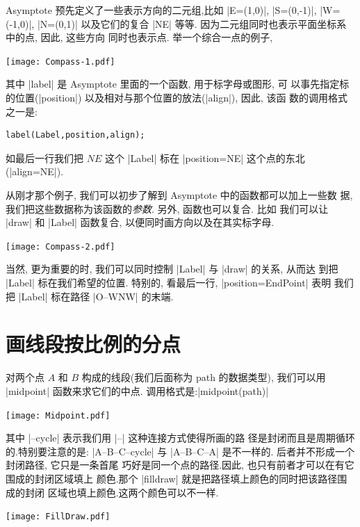 \documentclass{ctexbook}
\begin{document}
Asymptote 预先定义了一些表示方向的二元组,比如  |E=(1,0)|,
|S=(0,-1)|, |W=(-1,0)|, |N=(0,1)| 以及它们的复合
|NE| 等等. 因为二元组同时也表示平面坐标系中的点, 因此, 这些方向
同时也表示点. 举一个综合一点的例子,

\begin{center}\texttt{[image: Compass-1.pdf]}\end{center}%


其中 |label| 是 Asymptote 里面的一个函数, 用于标字母或图形, 可
以事先指定标的位置(|position|) 以及相对与那个位置的放法(|align|), 因此, 该函
数的调用格式之一是:
\begin{verbatim}
label(Label,position,align);
\end{verbatim}
如最后一行我们把 $NE$ 这个 |Label| 标在 |position=NE| 这个点的东北
(|align=NE|).

从刚才那个例子, 我们可以初步了解到 Asymptote 中的函数都可以加上一些数
据, 我们把这些数据称为该函数的\emph{参数}. 另外, 函数也可以复合. 比如
我们可以让 |draw| 和 |Label| 函数复合, 以便同时画方向以及在其实标字母.
\begin{center}\texttt{[image: Compass-2.pdf]}\end{center}%

当然, 更为重要的时, 我们可以同时控制 |Label| 与 |draw| 的关系, 从而达
到把 |Label| 标在我们希望的位置. 特别的, 看最后一行, |position=EndPoint| 表明
我们把 |Label| 标在路径 |O--WNW| 的末端.

\section{画线段按比例的分点}
对两个点 $A$ 和 $B$ 构成的线段(我们后面称为 {path} 的数据类型),
我们可以用 |midpoint| 函数来求它们的中点.
调用格式是:|midpoint(path)|

\begin{center}\texttt{[image: Midpoint.pdf]}\end{center}%


其中 |--cycle| 表示我们用 |--| 这种连接方式使得所画的路
径是封闭而且是周期循环的.特别要注意的是: |A--B--C--cycle| 与
|A--B--C--A| 是不一样的. 后者并不形成一个封闭路径, 它只是一条首尾
巧好是同一个点的路径.因此, 也只有前者才可以在有它围成的封闭区域填上
颜色.那个 |filldraw| 就是把路径填上颜色的同时把该路径围成的封闭
区域也填上颜色.这两个颜色可以不一样.
\begin{center}\texttt{[image: FillDraw.pdf]}\end{center}%

\end{document}
